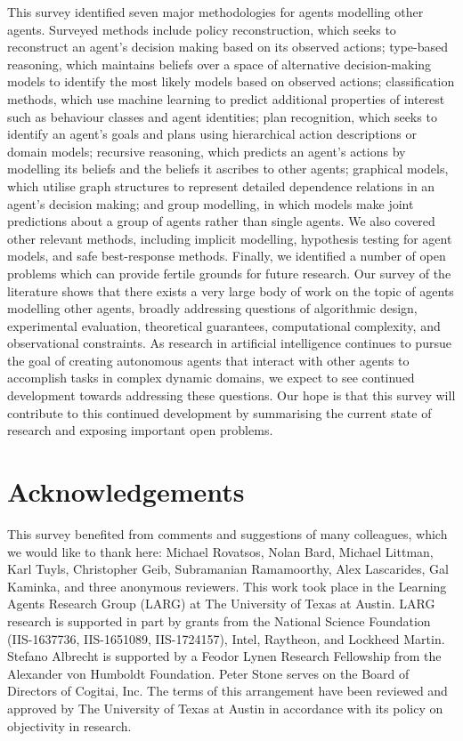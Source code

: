 \documentclass[final,1p,times,authoryear]{elsarticle}
\begin{document}
This survey identified seven major methodologies for agents modelling other agents. Surveyed methods include policy reconstruction, which seeks to reconstruct an agent's decision making based on its observed actions; type-based reasoning, which maintains beliefs over a space of alternative decision-making models to identify the most likely models based on observed actions; classification methods, which use machine learning to predict additional properties of interest such as behaviour classes and agent identities; plan recognition, which seeks to identify an agent's goals and plans using hierarchical action descriptions or domain models; recursive reasoning, which predicts an agent's actions by modelling its beliefs and the beliefs it ascribes to other agents; graphical models, which utilise graph structures to represent detailed dependence relations in an agent's decision making; and group modelling, in which models make joint predictions about a group of agents rather than single agents. We also covered other relevant methods, including implicit modelling, hypothesis testing for agent models, and safe best-response methods. Finally, we identified a number of open problems which can provide fertile grounds for future research. Our survey of the literature shows that there exists a very large body of work on the topic of agents modelling other agents, broadly addressing questions of algorithmic design, experimental evaluation, theoretical guarantees, computational complexity, and observational constraints. As research in artificial intelligence continues to pursue the goal of creating autonomous agents that interact with other agents to accomplish tasks in complex dynamic domains, we expect to see continued development towards addressing these questions. Our hope is that this survey will contribute to this continued development by summarising the current state of research and exposing important open problems.


	\section*{Acknowledgements}

This survey benefited from comments and suggestions of many colleagues, which we would like to thank here: Michael Rovatsos, Nolan Bard, Michael Littman, Karl Tuyls, Christopher Geib, Subramanian Ramamoorthy, Alex Lascarides, Gal Kaminka, and three anonymous reviewers. This work took place in the Learning Agents Research Group (LARG) at The University of Texas at Austin. LARG research is supported in part by grants from the National Science Foundation (IIS-1637736, IIS-1651089, IIS-1724157), Intel, Raytheon, and Lockheed Martin. Stefano Albrecht is supported by a Feodor Lynen Research Fellowship from the Alexander von Humboldt Foundation. Peter Stone serves on the Board of Directors of Cogitai, Inc. The terms of this arrangement have been reviewed and approved by The University of Texas at Austin in accordance with its policy on objectivity in research.
\end{document}

